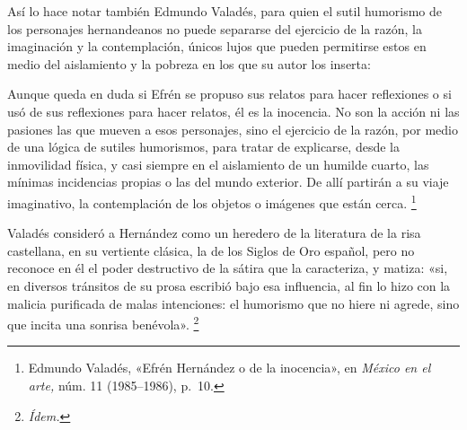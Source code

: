 \documentclass[14pt,twoside,final]{extbook} %
\let\oldfootnote\footnote
\renewcommand\footnote[1]{%
\oldfootnote{\hspace{1mm}#1}}
\begin{document}
Así lo hace notar también Edmundo Valadés, para quien el sutil humorismo de los personajes hernandeanos no puede separarse del ejercicio de la razón, la imaginación y la contemplación, únicos lujos que pueden permitirse estos en medio del aislamiento y la pobreza en los que su autor los inserta:\protect\enlargethispage*{\baselineskip}
\begin{quoting}
Aunque queda en duda si Efrén se propuso sus relatos para hacer reflexiones o si usó de sus reflexiones para hacer relatos, él es la inocencia. No son la acción ni las pasiones las que mueven a esos personajes, sino el ejercicio de la razón, por medio de una lógica de sutiles humorismos, para tratar de explicarse, desde la inmovilidad física, y casi siempre en el aislamiento de un humilde cuarto, las mínimas incidencias propias o las del mundo exterior. De allí partirán a su viaje imaginativo, la contemplación de los objetos o imágenes que están cerca.\footnote{Edmundo Valadés, «Efrén Hernández o de la inocencia», en \emph{México en el arte,} núm. 11 (1985--1986), p.~10.}
\end{quoting}
Valadés consideró a Hernández como un heredero de la literatura de la risa castellana, en su vertiente clásica, la de los Siglos de Oro español, pero no reconoce en él el poder destructivo de la sátira que la caracteriza, y matiza: «si, en diversos tránsitos de su prosa escribió bajo esa influencia, al fin lo hizo con la malicia purificada de malas intenciones: el humorismo que no hiere ni agrede, sino que incita una sonrisa benévola».\footnote{\em Ídem.}
\end{document}
